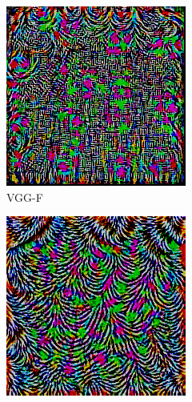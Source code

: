 \begin{figure}[ht!]
\begin{subfigure}{0.16\linewidth}
        \includegraphics[height=1\linewidth]{01-images/05-resultate/uap_paper/uap-paper-vgg-F.png}
        \caption{VGG-F}
    \end{subfigure}\hfill%
    \begin{subfigure}{0.16\linewidth}
        \centering
        \includegraphics[height=1\linewidth]{01-images/05-resultate/uap_paper/uap-paper-vgg16.png}

\end{subfigure}
\end{figure}

